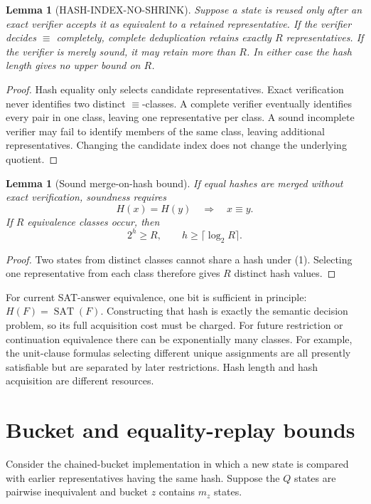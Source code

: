 \documentclass[11pt]{article}
\newtheorem{lemma}[theorem]{Lemma}
\newcommand{\SAT}{\operatorname{SAT}}
\newcommand{\E}{\mathrel{\equiv}}
\begin{document}
\begin{lemma}[HASH-INDEX-NO-SHRINK]
Suppose a state is reused only after an exact verifier accepts it as
equivalent to a retained representative.  If the verifier decides $\E$
completely, complete deduplication retains exactly $R$ representatives.  If
the verifier is merely sound, it may retain more than $R$.  In either case
the hash length gives no upper bound on $R$.
\end{lemma}

\begin{proof}
Hash equality only selects candidate representatives.  Exact verification
never identifies two distinct $\E$-classes.  A complete verifier eventually
identifies every pair in one class, leaving one representative per class.  A
sound incomplete verifier may fail to identify members of the same class,
leaving additional representatives.  Changing the candidate index does not
change the underlying quotient.
\end{proof}

\begin{lemma}[Sound merge-on-hash bound]
If equal hashes are merged without exact verification, soundness requires
\[
 H(x)=H(y)\quad\Longrightarrow\quad x\E y.
 \tag{1}
\]
If $R$ equivalence classes occur, then
\[
 2^h\ge R,
 \qquad
 h\ge\lceil\log_2R\rceil.
 \tag{2}
\]
\end{lemma}

\begin{proof}
Two states from distinct classes cannot share a hash under (1).  Selecting
one representative from each class therefore gives $R$ distinct hash values.
\end{proof}

For current SAT-answer equivalence, one bit is sufficient in principle:
$H(F)=\SAT(F)$.  Constructing that hash is exactly the semantic decision
problem, so its full acquisition cost must be charged.  For future
restriction or continuation equivalence there can be exponentially many
classes.  For example, the unit-clause formulas selecting different unique
assignments are all presently satisfiable but are separated by later
restrictions.  Hash length and hash acquisition are different resources.

\section{Bucket and equality-replay bounds}

Consider the chained-bucket implementation in which a new state is compared
with earlier representatives having the same hash.  Suppose the $Q$ states
are pairwise inequivalent and bucket $z$ contains $m_z$ states.
\end{document}

